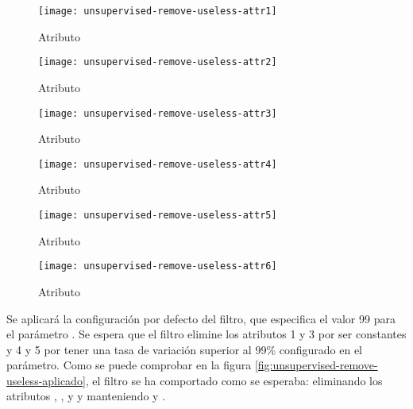 \begin{figure}[H]
    \centering
    \begin{minipage}{0.50\textwidth}
        \centering
        \texttt{[image: unsupervised-remove-useless-attr1]}
        \caption{Atributo }
        \label{fig:unsupervised-remove-useless-atr1}
    \end{minipage}\hfill
    \begin{minipage}{0.50\textwidth}
        \centering
        \texttt{[image: unsupervised-remove-useless-attr2]}
        \caption{Atributo }
        \label{fig:unsupervised-remove-useless-atr2}
    \end{minipage}
\end{figure}
\begin{figure}[H]
    \centering
    \begin{minipage}{0.50\textwidth}
        \centering
        \texttt{[image: unsupervised-remove-useless-attr3]}
        \caption{Atributo }
        \label{fig:unsupervised-remove-useless-atr3}
    \end{minipage}\hfill
    \begin{minipage}{0.50\textwidth}
        \centering
        \texttt{[image: unsupervised-remove-useless-attr4]}
        \caption{Atributo }
        \label{fig:unsupervised-remove-useless-atr4}
    \end{minipage}
\end{figure}
\begin{figure}[H]
    \centering
    \begin{minipage}{0.50\textwidth}
        \centering
        \texttt{[image: unsupervised-remove-useless-attr5]}
        \caption{Atributo }
        \label{fig:unsupervised-remove-useless-atr5}
    \end{minipage}\hfill
    \begin{minipage}{0.50\textwidth}
        \centering
        \texttt{[image: unsupervised-remove-useless-attr6]}
        \caption{Atributo }
        \label{fig:unsupervised-remove-useless-atr6}
    \end{minipage}
\end{figure}

Se aplicará la configuración por defecto del filtro, que especifica el valor 99 para el parámetro . Se espera que el filtro elimine los atributos 1 y 3 por ser constantes y 4 y 5 por tener una tasa de variación superior al 99\% configurado en el parámetro. Como se puede comprobar en la figura \ref{fig:unsupervised-remove-useless-aplicado}, el filtro se ha comportado como se esperaba: eliminando los atributos , ,  y  y manteniendo  y .


